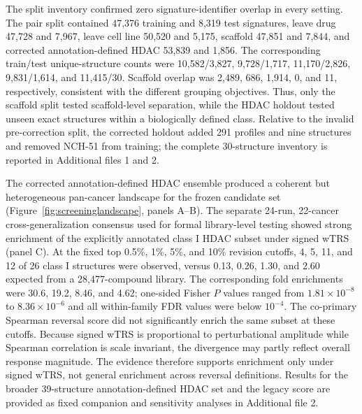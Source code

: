 The split inventory confirmed zero signature-identifier overlap in every setting. The pair split contained 47,376 training and 8,319 test signatures, leave drug 47,728 and 7,967, leave cell line 50,520 and 5,175, scaffold 47,851 and 7,844, and corrected annotation-defined HDAC 53,839 and 1,856. The corresponding train/test unique-structure counts were 10,582/3,827, 9,728/1,717, 11,170/2,826, 9,831/1,614, and 11,415/30. Scaffold overlap was 2,489, 686, 1,914, 0, and 11, respectively, consistent with the different grouping objectives. Thus, only the scaffold split tested scaffold-level separation, while the HDAC holdout tested unseen exact structures within a biologically defined class. Relative to the invalid pre-correction split, the corrected holdout added 291 profiles and nine structures and removed NCH-51 from training; the complete 30-structure inventory is reported in Additional files 1 and 2.


\begin{roundtworevision}
The corrected annotation-defined HDAC ensemble produced a coherent but heterogeneous pan-cancer landscape for the frozen candidate set (Figure~\ref{fig:screeninglandscape}, panels A--B). The separate 24-run, 22-cancer cross-generalization consensus used for formal library-level testing showed strong enrichment of the explicitly annotated class I HDAC subset under signed wTRS (panel C). At the fixed top 0.5\%, 1\%, 5\%, and 10\% revision cutoffs, 4, 5, 11, and 12 of 26 class I structures were observed, versus 0.13, 0.26, 1.30, and 2.60 expected from a 28,477-compound library. The corresponding fold enrichments were 30.6, 19.2, 8.46, and 4.62; one-sided Fisher $P$ values ranged from $1.81\times10^{-8}$ to $8.36\times10^{-6}$ and all within-family FDR values were below $10^{-4}$. The co-primary Spearman reversal score did not significantly enrich the same subset at these cutoffs. Because signed wTRS is proportional to perturbational amplitude while Spearman correlation is scale invariant, the divergence may partly reflect overall response magnitude. The evidence therefore supports enrichment only under signed wTRS, not general enrichment across reversal definitions. Results for the broader 39-structure annotation-defined HDAC set and the legacy score are provided as fixed companion and sensitivity analyses in Additional file 2.
\end{roundtworevision}

